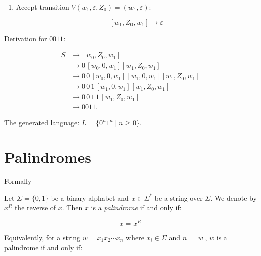 \documentclass[12pt,a4paper,openany]{article}
\begin{document}
\begin{enumerate}
\begin{enumerate}
\item Accept transition $V(w_1, \varepsilon, Z_0) = (w_1, \varepsilon)$:

\[
[w_1, Z_0, w_1] \to \varepsilon
\]

\end{enumerate}

\begin{center}
\end{center}


Derivation for $0011$:

\[
\begin{aligned}
S
  &\to [w_0, Z_0, w_1] \\
  &\to 0\,[w_0, 0, w_1][w_1, Z_0, w_1] \\
  &\to 0\,0\,[w_0, 0, w_1][w_1, 0, w_1][w_1, Z_0, w_1] \\
  &\to 0\,0\,1\,[w_1, 0, w_1][w_1, Z_0, w_1] \\
  &\to 0\,0\,1\,1\,[w_1, Z_0, w_1] \\
  &\to 0011.
\end{aligned}
\]

The generated language: $L = \{0^n 1^n \mid n \ge 0\}$.

\end{enumerate}

\section{Palindromes}

Formally

Let $\Sigma = \{0, 1\}$ be a binary alphabet and $x \in \Sigma^*$ be a string over $\Sigma$. We denote by $x^R$ the reverse of $x$. Then $x$ is a \emph{palindrome} if and only if:

\[
x = x^R
\]

Equivalently, for a string $w = x_1 x_2 \cdots x_n$ where $x_i \in \Sigma$ and $n = |w|$, $w$ is a palindrome if and only if:
\end{document}
